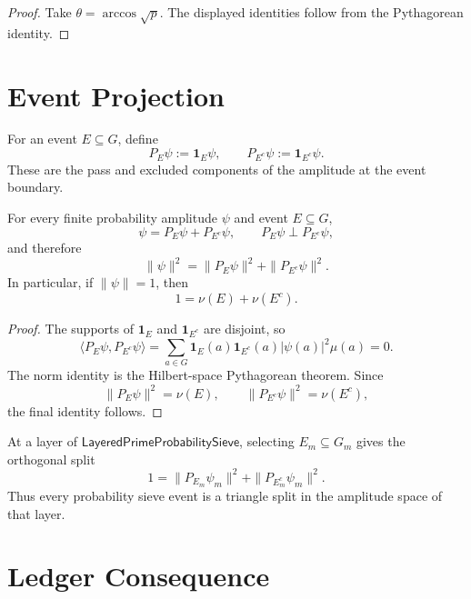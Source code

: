 \begin{proof}
Take $\theta=\arccos\sqrt p$.  The displayed identities follow from
the Pythagorean identity.
\end{proof}

\section{Event Projection}
\label{sec:rh-probability-event-projection}

\begin{definition}
\label{def:rh-probability-event-projection}
For an event $E\subseteq G$, define
$$
P_E\psi:=\mathbf 1_E\psi,
\qquad
P_{E^c}\psi:=\mathbf 1_{E^c}\psi.
$$
These are the pass and excluded components of the amplitude at the
event boundary.
\end{definition}

\begin{theorem}
\label{thm:rh-event-projection-pythagorean-law}
For every finite probability amplitude $\psi$ and event $E\subseteq G$,
$$
\psi=P_E\psi+P_{E^c}\psi,
\qquad
P_E\psi\perp P_{E^c}\psi,
$$
and therefore
$$
\|\psi\|^2
=
\|P_E\psi\|^2+\|P_{E^c}\psi\|^2.
$$
In particular, if $\|\psi\|=1$, then
$$
1=\nu(E)+\nu(E^c).
$$
\end{theorem}

\begin{proof}
The supports of $\mathbf 1_E$ and $\mathbf 1_{E^c}$ are disjoint, so
$$
\langle P_E\psi,P_{E^c}\psi\rangle
=
\sum_{a\in G}
\mathbf 1_E(a)\mathbf 1_{E^c}(a)|\psi(a)|^2\mu(a)
=
0.
$$
The norm identity is the Hilbert-space Pythagorean theorem.  Since
$$
\|P_E\psi\|^2=\nu(E),
\qquad
\|P_{E^c}\psi\|^2=\nu(E^c),
$$
the final identity follows.
\end{proof}

\begin{corollary}
\label{cor:rh-sieve-events-orthogonal-triangle-splits}
At a layer of $\mathsf{LayeredPrimeProbabilitySieve}$, selecting
$E_m\subseteq G_m$ gives the orthogonal split
$$
1
=
\|P_{E_m}\psi_m\|^2+\|P_{E_m^c}\psi_m\|^2.
$$
Thus every probability sieve event is a triangle split in the amplitude
space of that layer.
\end{corollary}

\section{Ledger Consequence}
\label{sec:rh-probability-ledger-consequence}

